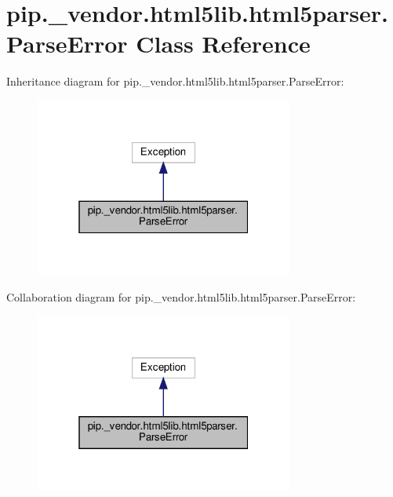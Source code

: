 \hypertarget{classpip_1_1__vendor_1_1html5lib_1_1html5parser_1_1ParseError}{}\section{pip.\+\_\+vendor.\+html5lib.\+html5parser.\+Parse\+Error Class Reference}
\label{classpip_1_1__vendor_1_1html5lib_1_1html5parser_1_1ParseError}


Inheritance diagram for pip.\+\_\+vendor.\+html5lib.\+html5parser.\+Parse\+Error\+:
\nopagebreak
\begin{figure}[H]
\begin{center}
\leavevmode
\includegraphics[width=241pt]{classpip_1_1__vendor_1_1html5lib_1_1html5parser_1_1ParseError__inherit__graph}
\end{center}
\end{figure}


Collaboration diagram for pip.\+\_\+vendor.\+html5lib.\+html5parser.\+Parse\+Error\+:
\nopagebreak
\begin{figure}[H]
\begin{center}
\leavevmode
\includegraphics[width=241pt]{classpip_1_1__vendor_1_1html5lib_1_1html5parser_1_1ParseError__coll__graph}
\end{center}
\end{figure}


